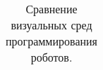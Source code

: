 \documentclass[a5paper]{article}
\begin{document}
\begin{center}
\begin{table}[ht]
\begin{tabular}{ | c | c | c | c | c | c | c | c | c | c | c | c | c | }
  	\hline
  \end{tabular}
  \caption{Сравнение визуальных сред программирования роботов.}
  \label{table:results}
\end{table}
\end{center}

\pagebreak



\end{document}
